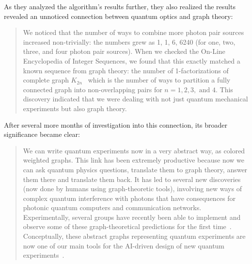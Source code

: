 As they analyzed the algorithm's results further, they also realized the results revealed an unnoticed connection between quantum optics and graph theory:

\begin{quote}

We noticed that the number of ways to combine more photon pair sources increased non-trivially: the numbers grew as 1, 1, 6, 6240 (for one, two, three, and four photon pair sources).
When we checked the On-Line Encyclopedia of Integer Sequences, we found that this exactly matched a known sequence from graph theory: the number of 1-factorizations of complete graph $K_{2n}$~\citep{SloaneA000438} which is the number of ways to partition a fully connected graph into non-overlapping pairs for $n = 1, 2, 3, \text{ and } 4$.
This discovery indicated that we were dealing with not just quantum mechanical experiments but also graph theory.

\end{quote}

After several more months of investigation into this connection, its broader significance became clear:

\begin{quote}

We can write quantum experiments now in a very abstract way, as colored weighted graphs. 
This link has been extremely productive because now we can ask quantum physics questions, translate them to graph theory, answer them there and translate them back.
It has led to several new discoveries (now done by humans using graph-theoretic tools), involving new ways of complex quantum interference with photons that have consequences for photonic quantum computers and communication networks.
Experimentally, several groups have recently been able to implement and observe some of these graph-theoretical predictions for the first time~\citep{Bao2023, Feng23Opt, Qian2023}.
Conceptually, these abstract graphs representing quantum experiments are now one of our main tools for the AI-driven design of new quantum experiments~\citep{RuizGonzalez2023}.

\end{quote}

